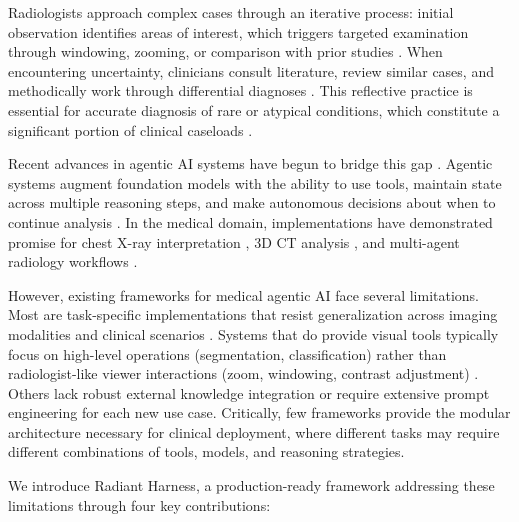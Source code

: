 \documentclass[11pt]{article}
\begin{document}
Radiologists approach complex cases through an iterative process: initial observation identifies areas of interest, which triggers targeted examination through windowing, zooming, or comparison with prior studies \citep{kundel2006visual}. When encountering uncertainty, clinicians consult literature, review similar cases, and methodically work through differential diagnoses \citep{graber2005diagnostic}. This reflective practice is essential for accurate diagnosis of rare or atypical conditions, which constitute a significant portion of clinical caseloads \citep{erbe2014prevalence, bercea2025nova}.

Recent advances in agentic AI systems have begun to bridge this gap \citep{bluethgen2025agentic, kocak2025agents}. Agentic systems augment foundation models with the ability to use tools, maintain state across multiple reasoning steps, and make autonomous decisions about when to continue analysis \citep{wang2024survey}. In the medical domain, implementations have demonstrated promise for chest X-ray interpretation \citep{sharma2024cxragent}, 3D CT analysis \citep{mao2025ctagent}, and multi-agent radiology workflows \citep{radagents2025}.

However, existing frameworks for medical agentic AI face several limitations. Most are task-specific implementations that resist generalization across imaging modalities and clinical scenarios \citep{sharma2024cxragent, mao2025ctagent}. Systems that do provide visual tools typically focus on high-level operations (segmentation, classification) rather than radiologist-like viewer interactions (zoom, windowing, contrast adjustment) \citep{medrax2025}. Others lack robust external knowledge integration or require extensive prompt engineering for each new use case. Critically, few frameworks provide the modular architecture necessary for clinical deployment, where different tasks may require different combinations of tools, models, and reasoning strategies.

We introduce Radiant Harness, a production-ready framework addressing these limitations through four key contributions:
\end{document}
